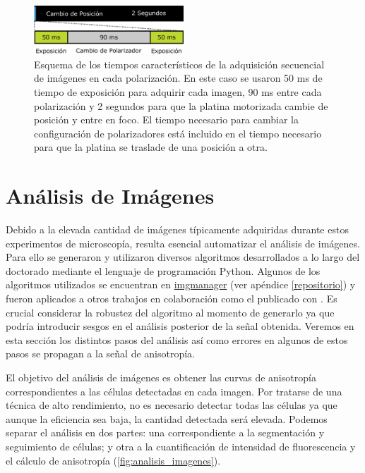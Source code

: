 \begin{figure}
    \centering
    \includegraphics[width=0.5\textwidth]{img/cap_2/tiempo_adq_un_canal.pdf}
    \caption{\footnotesize{Esquema de los tiempos característicos de la adquisición secuencial de imágenes en cada polarización. En este caso se usaron 50 ms de tiempo de exposición para adquirir cada imagen, 90 ms entre cada polarización y 2 segundos para que la platina motorizada cambie de posición y entre en foco. El tiempo necesario para cambiar la configuración de polarizadores está incluido en el tiempo necesario para que la platina se traslade de una posición a otra.}}
    \label{fig:tiempo_adq_un_canal}
\end{figure}


\section{Análisis de Imágenes}


Debido a la elevada cantidad de imágenes típicamente adquiridas durante estos experimentos de microscopía, resulta esencial automatizar el análisis de imágenes. Para ello se generaron y utilizaron diversos algoritmos desarrollados a lo largo del doctorado mediante el lenguaje de programación Python. Algunos de los algoritmos utilizados se encuentran en \href{https://github.com/acorbat/img_manager}{img\textunderscore manager} (ver apéndice \ref{repositorio}) y fueron aplicados a otros trabajos en colaboración como el publicado con \cite{Fernandez-Alvarez2020}. Es crucial considerar la robustez del algoritmo al momento de generarlo ya que podría introducir sesgos en el análisis posterior de la señal obtenida. Veremos en esta sección los distintos pasos del análisis así como errores en algunos de estos pasos se propagan a la señal de anisotropía.

El objetivo del análisis de imágenes es obtener las curvas de anisotropía correspondientes a las células detectadas en cada imagen. Por tratarse de una técnica de alto rendimiento, no es necesario detectar todas las células ya que aunque la eficiencia sea baja, la cantidad detectada será elevada. Podemos separar el análisis en dos partes: una correspondiente a la segmentación y seguimiento de células; y otra a la cuantificación de intensidad de fluorescencia y el cálculo de anisotropía (\cref{fig:analisis_imagenes}).

